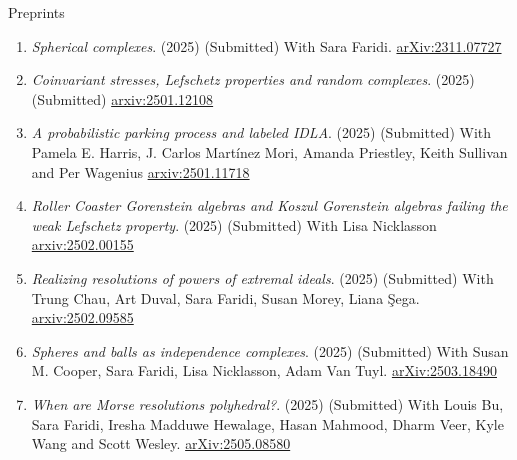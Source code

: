 \documentclass[12pt]{resume} %
\begin{document}
\begin{rSection}{Preprints}

\begin{enumerate}
    \item \textit{Spherical complexes}. (2025) (Submitted) With Sara Faridi. \href{https://arxiv.org/abs/2311.07727}{arXiv:2311.07727}
    \item \textit{Coinvariant stresses, Lefschetz properties and random complexes}. (2025) (Submitted) \href{https://arxiv.org/abs/2501.12108}{arxiv:2501.12108}
    \item \textit{A probabilistic parking process and labeled IDLA}. (2025) (Submitted) With Pamela E. Harris, J. Carlos Martínez Mori, Amanda Priestley, Keith Sullivan and Per Wagenius  \href{https://arxiv.org/abs/2501.11718}{arxiv:2501.11718}
    \item \textit{Roller Coaster Gorenstein algebras and Koszul Gorenstein algebras failing the weak Lefschetz property}. (2025) (Submitted) With Lisa Nicklasson  \href{https://arxiv.org/abs/2502.00155}{arxiv:2502.00155}
    \item \textit{Realizing resolutions of powers of extremal ideals}. (2025) (Submitted) With Trung Chau, Art Duval, Sara Faridi, Susan Morey, Liana \c{S}ega. \href{https://arxiv.org/abs/2502.09585}{arxiv:2502.09585}
    \item \textit{Spheres and balls as independence complexes}. (2025) (Submitted) With Susan M. Cooper, Sara Faridi, Lisa Nicklasson, Adam Van Tuyl. \href{https://arxiv.org/abs/2503.18490}{arXiv:2503.18490}
    \item \textit{When are Morse resolutions polyhedral?}. (2025) (Submitted) With Louis Bu, Sara Faridi, Iresha Madduwe Hewalage, Hasan Mahmood, Dharm Veer, Kyle Wang and Scott Wesley. \href{https://arxiv.org/abs/2505.08580}{arXiv:2505.08580} 
\end{enumerate}
\end{rSection}






    
\end{document}
